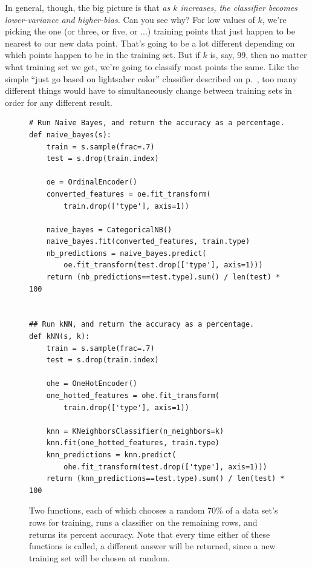 In general, though, the big picture is that \textit{as $k$ increases, the
classifier becomes lower-variance and higher-bias.} Can you see why? For low
values of $k$, we're picking the one (or three, or five, or ...) training
points that just happen to be nearest to our new data point. That's going to be
a lot different depending on which points happen to be in the training set. But
if $k$ is, say, 99, then no matter what training set we get, we're going to
classify most points the same. Like the simple ``just go based on lightsaber
color'' classifier described on p.~\pageref{simpleClassifierTable}, too many
different things would have to simultaneously change between training sets in
order for any different result.
\vspace{1in}
\pagebreak
\vspace{1in}

\begin{figure}[ht]
\centering
\begin{Verbatim}[fontsize=\footnotesize,samepage=true,frame=single,framesep=3mm]
# Run Naive Bayes, and return the accuracy as a percentage.
def naive_bayes(s):
    train = s.sample(frac=.7)
    test = s.drop(train.index)

    oe = OrdinalEncoder()
    converted_features = oe.fit_transform(
        train.drop(['type'], axis=1))

    naive_bayes = CategoricalNB()
    naive_bayes.fit(converted_features, train.type)
    nb_predictions = naive_bayes.predict(
        oe.fit_transform(test.drop(['type'], axis=1)))
    return (nb_predictions==test.type).sum() / len(test) * 100


## Run kNN, and return the accuracy as a percentage.
def kNN(s, k):
    train = s.sample(frac=.7)
    test = s.drop(train.index)

    ohe = OneHotEncoder()
    one_hotted_features = ohe.fit_transform(
        train.drop(['type'], axis=1))

    knn = KNeighborsClassifier(n_neighbors=k)
    knn.fit(one_hotted_features, train.type)
    knn_predictions = knn.predict(
        ohe.fit_transform(test.drop(['type'], axis=1)))
    return (knn_predictions==test.type).sum() / len(test) * 100
\end{Verbatim}

\caption{Two functions, each of which chooses a random 70\% of a data set's
rows for training, runs a classifier on the remaining rows, and returns its
percent accuracy. Note that every time either of these functions is called, a
different answer will be returned, since a new training set will be chosen at
random.}
\label{comparisonCode}
\end{figure}

